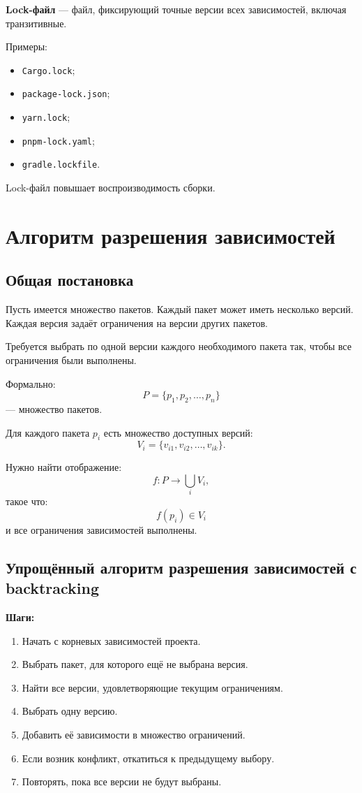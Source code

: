 \documentclass[12pt,a4paper]{article}
\begin{document}
\textbf{Lock-файл} --- файл, фиксирующий точные версии всех зависимостей, включая транзитивные.

Примеры:
\begin{itemize}
    \item \texttt{Cargo.lock};
    \item \texttt{package-lock.json};
    \item \texttt{yarn.lock};
    \item \texttt{pnpm-lock.yaml};
    \item \texttt{gradle.lockfile}.
\end{itemize}

Lock-файл повышает воспроизводимость сборки.

\section{Алгоритм разрешения зависимостей}

\subsection{Общая постановка}

Пусть имеется множество пакетов. Каждый пакет может иметь несколько версий. Каждая версия задаёт ограничения на версии других пакетов.

Требуется выбрать по одной версии каждого необходимого пакета так, чтобы все ограничения были выполнены.

Формально:
\[
P = \{p_1, p_2, \ldots, p_n\}
\]
--- множество пакетов.

Для каждого пакета $p_i$ есть множество доступных версий:
\[
V_i = \{v_{i1}, v_{i2}, \ldots, v_{ik}\}.
\]

Нужно найти отображение:
\[
f: P \rightarrow \bigcup_i V_i,
\]
такое что:
\[
f(p_i) \in V_i
\]
и все ограничения зависимостей выполнены.

\subsection{Упрощённый алгоритм разрешения зависимостей с backtracking}

\textbf{Шаги:}
\begin{enumerate}
    \item Начать с корневых зависимостей проекта.
    \item Выбрать пакет, для которого ещё не выбрана версия.
    \item Найти все версии, удовлетворяющие текущим ограничениям.
    \item Выбрать одну версию.
    \item Добавить её зависимости в множество ограничений.
    \item Если возник конфликт, откатиться к предыдущему выбору.
    \item Повторять, пока все версии не будут выбраны.
\end{enumerate}
\end{document}
